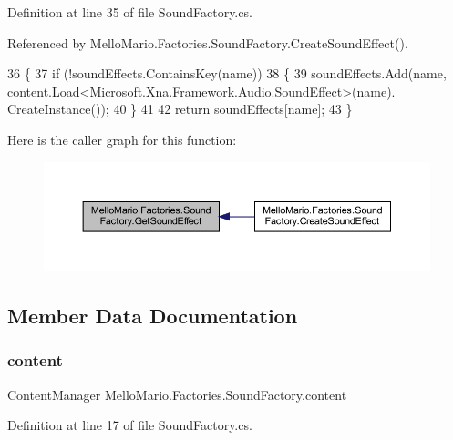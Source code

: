 Definition at line 35 of file Sound\+Factory.\+cs.



Referenced by Mello\+Mario.\+Factories.\+Sound\+Factory.\+Create\+Sound\+Effect().


\begin{DoxyCode}
36         \{
37             \textcolor{keywordflow}{if} (!soundEffects.ContainsKey(name))
38             \{
39                 soundEffects.Add(name, content.Load<Microsoft.Xna.Framework.Audio.SoundEffect>(name).
      CreateInstance());
40             \}
41 
42             \textcolor{keywordflow}{return} soundEffects[name];
43         \}
\end{DoxyCode}
Here is the caller graph for this function\+:
\nopagebreak
\begin{figure}[H]
\begin{center}
\leavevmode
\includegraphics[width=350pt]{classMelloMario_1_1Factories_1_1SoundFactory_a72626a611369e04547b8001970e80407_icgraph}
\end{center}
\end{figure}


\subsection{Member Data Documentation}
\mbox{\label{classMelloMario_1_1Factories_1_1SoundFactory_a08232277f28ed55e1b832310af152e23}} 
\subsubsection{content}
{\footnotesize\ttfamily Content\+Manager Mello\+Mario.\+Factories.\+Sound\+Factory.\+content\hspace{0.3cm}{\ttfamily [private]}}



Definition at line 17 of file Sound\+Factory.\+cs.

